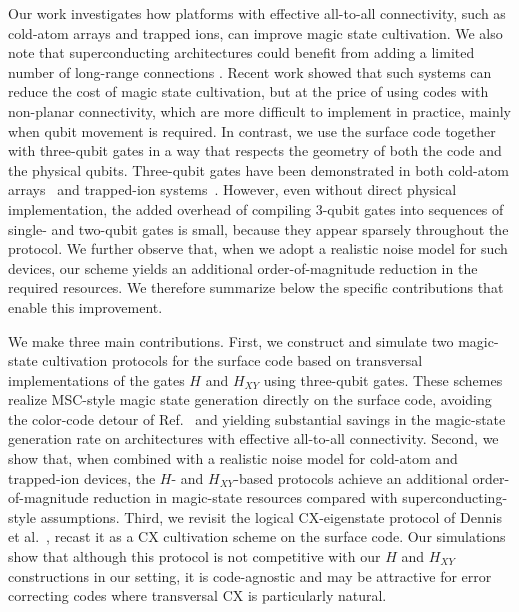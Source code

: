 \documentclass[twocolumn,notitlepage,nofootinbib,floatfix,superscriptaddress]{revtex4-1}
\begin{document}
Our work investigates how platforms with effective all-to-all connectivity, such as cold-atom arrays and trapped ions, can improve magic state cultivation. We also note that superconducting architectures could benefit from adding a limited number of long-range connections \cite{niu2023low, yoder2025tourgrossmodularquantum,marxer2023long,wang2025demonstration,bravyi2024high}. Recent work \cite{chen2025efficient} showed that such systems can reduce the cost of magic state cultivation, but at the price of using codes with non-planar connectivity, which are more difficult to implement in practice, mainly when qubit movement is required. In contrast, we use the surface code together with three-qubit gates in a way that respects the geometry of both the code and the physical qubits. Three-qubit gates have been demonstrated in both cold-atom arrays~\cite{levine2019parallel, evered2023high} and trapped-ion systems~\cite{lu2019global}. However, even without direct physical implementation, the added overhead of compiling 3-qubit gates into sequences of single- and two-qubit gates is small, because they appear sparsely throughout the protocol. We further observe that, when we adopt a realistic noise model for such devices, our scheme yields an additional order-of-magnitude reduction in the required resources. We therefore summarize below the specific contributions that enable this improvement.

We make three main contributions. First, we construct and simulate two magic-state cultivation protocols for the surface code based on transversal implementations of the gates $H$ and $H_{XY}$ using three-qubit gates. These schemes realize MSC-style magic state generation directly on the surface code, avoiding the color-code detour of Ref.~\cite{gidney2024magic} and yielding substantial savings in the magic-state generation rate on architectures with effective all-to-all connectivity. Second, we show that, when combined with a realistic noise model for cold-atom and trapped-ion devices, the $H$- and $H_{XY}$-based protocols achieve an additional order-of-magnitude reduction in magic-state resources compared with superconducting-style assumptions. Third, we revisit the logical $\mathrm{CX}$-eigenstate protocol of Dennis et al.~\cite{dennis2001toward,gupta2024encoding}, recast it as a $\mathrm{CX}$ cultivation scheme on the surface code. Our simulations show that although this protocol is not competitive with our $H$ and $H_{XY}$ constructions in our setting, it is code-agnostic and may be attractive for error correcting codes where transversal $\mathrm{CX}$ is particularly natural.
\end{document}
